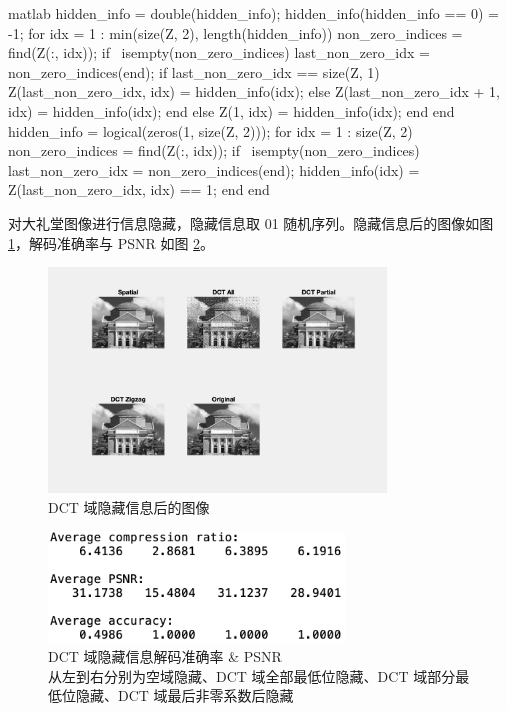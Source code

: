 \documentclass[a4paper]{article}  %
\begin{document}
\begin{codeblock}{matlab}
hidden_info = double(hidden_info);
hidden_info(hidden_info == 0) = -1;
for idx = 1 : min(size(Z, 2), length(hidden_info))
    non_zero_indices = find(Z(:, idx));
    if ~isempty(non_zero_indices)
        last_non_zero_idx = non_zero_indices(end);
        if last_non_zero_idx == size(Z, 1)
            Z(last_non_zero_idx, idx) = hidden_info(idx);
        else
            Z(last_non_zero_idx + 1, idx) = hidden_info(idx);
        end
    else
        Z(1, idx) = hidden_info(idx);
    end
end
hidden_info = logical(zeros(1, size(Z, 2)));
for idx = 1 : size(Z, 2)
    non_zero_indices = find(Z(:, idx));
    if ~isempty(non_zero_indices)
        last_non_zero_idx = non_zero_indices(end);
        hidden_info(idx) = Z(last_non_zero_idx, idx) == 1;
    end
end
\end{codeblock}

对大礼堂图像进行信息隐藏，隐藏信息取 01 随机序列。隐藏信息后的图像如图 \ref{fig:3_2_decode}，解码准确率与 PSNR 如图 \ref{fig:3_2_res}。

\begin{figure}[ht]
    \centering
    \includegraphics[width=0.8\textwidth]{asserts/3_2_decode.png}
    \caption{
        DCT 域隐藏信息后的图像
    }\label{fig:3_2_decode}
\end{figure}

\begin{figure}[ht]
    \centering
    \includegraphics[width=0.7\textwidth]{asserts/3_2_res.png}
    \caption{
        DCT 域隐藏信息解码准确率 \& PSNR \\
        从左到右分别为空域隐藏、DCT 域全部最低位隐藏、DCT 域部分最低位隐藏、DCT 域最后非零系数后隐藏\\
    }\label{fig:3_2_res}
\end{figure}
\end{document}
